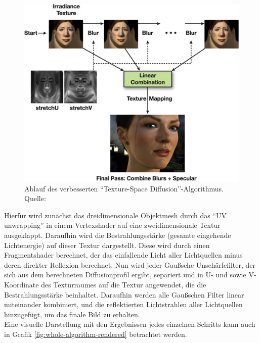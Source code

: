 \documentclass[ngerman,runningheads,a4paper]{llncs}[2018/03/10]
\begin{document}
\begin{figure}
  \centering
  \includegraphics[scale=0.8,keepaspectratio]{./images/texture-space-algorithm.jpg}
  \caption{Ablauf des verbesserten \enquote{Texture-Space Diffusion}-Algorithmus. Quelle: \cite{advanced-realtime-skin-rendering}}
  \label{fig:algorithm}
\end{figure}

Hierfür wird zunächst das dreidimensionale Objektmesh durch das \enquote{UV unwrapping} in einem Vertexshader auf eine zweidimensionale Textur ausgeklappt.
Daraufhin wird die Bestrahlungsstärke (gesamte eingehende Lichtenergie) auf dieser Textur dargestellt.
Diese wird durch einen Fragmentshader berechnet, der das einfallende Licht aller Lichtquellen minus deren direkter Reflexion berechnet.
Nun wird jeder Gaußsche Unschärfefilter, der sich aus dem berechneten Diffusionprofil ergibt, separiert und in U- und sowie V-Koordinate des Texturraumes auf die Textur angewendet, die die Bestrahlungsstärke beinhaltet.
Daraufhin werden alle Gaußschen Filter linear miteinander kombiniert, und die reflektierten Lichtstrahlen aller Lichtquellen hinzugefügt, um das finale Bild zu erhalten. \\
Eine visuelle Darstellung mit den Ergebnissen jedes einzelnen Schritts kann auch in Grafik \ref{fig:whole-algorithm-rendered} betrachtet werden.
\end{document}
